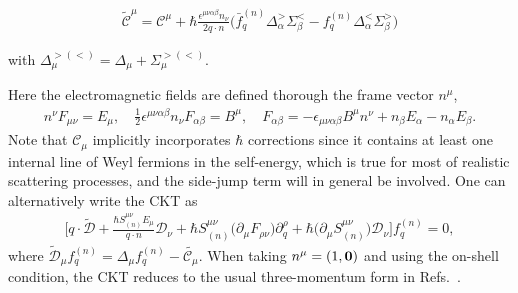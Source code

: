 \documentclass[aps,prd,showkeys,preprint,amsmath,amssymb,nofootinbib]{revtex4-1}
\newcommand{\red}[1]{{\color{red} #1} }
\begin{document}
	\begin{eqnarray}
	\tilde{\mathcal{C}}^{\mu}=\mathcal{C}^{\mu}+\hbar\frac{\epsilon^{\mu\nu\alpha\beta}n_{\nu}}{2q\cdot n} %
	\big(\bar{f}^{(n)}_q\Delta^>_{\alpha}\Sigma^{<}_{\beta}-f^{(n)}_q\Delta^<_{\alpha}\Sigma^{>}_{\beta}\big)
	\end{eqnarray}

with $\Delta^{>(<)}_{\mu}=\Delta_{\mu}+\Sigma_{\mu}^{>(<)}$.

Here the electromagnetic fields are defined thorough the frame vector $n^{\mu}$,
\begin{eqnarray}\label{EM_def}
n^{\nu}F_{\mu\nu}=E_{\mu},\quad \frac{1}{2}\epsilon^{\mu\nu\alpha\beta}n_{\nu}F_{\alpha\beta}=B^{\mu},\quad F_{\alpha\beta}=-\epsilon_{\mu\nu\alpha\beta}B^{\mu}n^{\nu}+n_{\beta}E_{\alpha}-n_{\alpha}E_{\beta}.
\end{eqnarray}
Note that $\mathcal{C}_{\mu}$ implicitly incorporates $\hbar$ corrections since it contains at least one internal line of Weyl fermions in the self-energy, which is true for most of realistic scattering processes, and the side-jump term will in general be involved. One can alternatively write the CKT as
\begin{eqnarray}
\Bigg[q\cdot\tilde{\mathcal{D}}+\frac{\hbar S^{\mu\nu}_{(n)}E_{\mu}}{q\cdot n}\mathcal{D}_{\nu}+\hbar S^{\mu\nu}_{(n)}\big(\partial_{\mu}F_{\rho\nu}\big)\partial^{\rho}_q+\hbar\big(\partial_{\mu}S^{\mu\nu}_{(n)}\big)\mathcal{D}_{\nu}
\Bigg]f^{(n)}_q
=0,
\end{eqnarray}
where $\tilde{\mathcal{D}}_{\mu}f^{(n)}_q=\Delta_{\mu} f^{(n)}_q-\tilde{\mathcal{C}_{\mu}}$.
When taking $n^{\mu}=(1,{\bf 0})$ and using the on-shell condition, the CKT reduces to the usual  three-momentum form in Refs.~\cite{Son:2012zy,Hidaka:2016yjf}.
\end{document}
